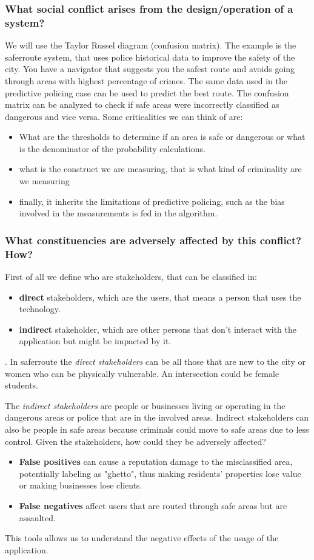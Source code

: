 \subsubsection{What social conflict arises from the design/operation of a system?}
We will use the Taylor Russel diagram (confusion matrix). The example is the saferroute system, that uses police historical data to improve the safety of the city. You have a navigator that suggests you the safest route and avoids going through areas with highest percentage of crimes. The same data used in the predictive policing case can be used to predict the best route. The confusion matrix can be analyzed to check if safe areas were incorrectly classified as dangerous and vice versa. Some criticalities we can think of are:
\begin{itemize}
    \item What are the thresholds to determine if an area is safe or dangerous or what is the denominator of the probability calculations.
    \item what is the construct we are measuring, that is what kind of criminality are we measuring
    \item finally, it inherits the limitations of predictive policing, such as the bias involved in the measurements is fed in the algorithm.
\end{itemize}
\subsubsection{What constituencies are adversely affected by this conflict? How?}
First of all we define who are stakeholders, that can be classified in:
\begin{itemize}
    \item \textbf{direct} stakeholders, which are the users, that means a person that uses the technology.
    \item \textbf{indirect} stakeholder, which are other persons that don't interact with the application but might be impacted by it.
\end{itemize}. 
In saferroute the \textit{direct stakeholders} can be all those that are new to the city or women who can be physically vulnerable. An intersection could be female students. 

The \textit{indirect stakeholders} are people or businesses living or operating in the dangerous areas or police that are in the involved areas. Indirect stakeholders can also be people in safe areas because criminals could move to safe areas due to less control. 
Given the stakeholders, how could they be adversely affected? 
\begin{itemize}
    \item \textbf{False positives} can cause a reputation damage to the misclassified area, potentially labeling as "ghetto", thus making residents' properties lose value or making businesses lose clients.
    \item \textbf{False negatives} affect users that are routed through safe areas but are assaulted.
\end{itemize}
This tools allows us to understand the negative effects of the usage of the application. 
